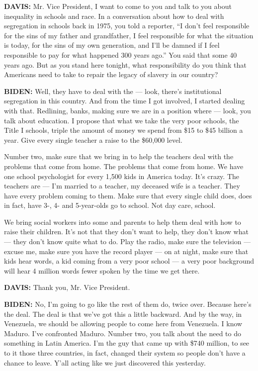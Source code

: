 \textbf{DAVIS:} Mr. Vice President, I want to come to you and talk to
you about inequality in schools and race. In a conversation about how to
deal with segregation in schools back in 1975, you told a reporter, ``I
don't feel responsible for the sins of my father and grandfather, I feel
responsible for what the situation is today, for the sins of my own
generation, and I'll be damned if I feel responsible to pay for what
happened 300 years ago.'' You said that some 40 years ago. But as you
stand here tonight, what responsibility do you think that Americans need
to take to repair the legacy of slavery in our country?

\textbf{BIDEN:} Well, they have to deal with the --- look, there's
institutional segregation in this country. And from the time I got
involved, I started dealing with that. Redlining, banks, making sure we
are in a position where --- look, you talk about education. I propose
that what we take the very poor schools, the Title I schools, triple the
amount of money we spend from \$15 to \$45 billion a year. Give every
single teacher a raise to the \$60,000 level.

Number two, make sure that we bring in to help the teachers deal with
the problems that come from home. The problems that come from home. We
have one school psychologist for every 1,500 kids in America today. It's
crazy. The teachers are --- I'm married to a teacher, my deceased wife
is a teacher. They have every problem coming to them. Make sure that
every single child does, does in fact, have 3-, 4- and 5-year-olds go to
school. Not day care, school.

We bring social workers into some and parents to help them deal with how
to raise their children. It's not that they don't want to help, they
don't know what --- they don't know quite what to do. Play the radio,
make sure the television --- excuse me, make sure you have the record
player --- on at night, make sure that kids hear words, a kid coming
from a very poor school --- a very poor background will hear 4 million
words fewer spoken by the time we get there.

\textbf{DAVIS:} Thank you, Mr. Vice President.

\textbf{BIDEN:} No, I'm going to go like the rest of them do, twice
over. Because here's the deal. The deal is that we've got this a little
backward. And by the way, in Venezuela, we should be allowing people to
come here from Venezuela. I know Maduro. I've confronted Maduro. Number
two, you talk about the need to do something in Latin America. I'm the
guy that came up with \$740 million, to see to it those three countries,
in fact, changed their system so people don't have a chance to leave.
Y'all acting like we just discovered this yesterday.


